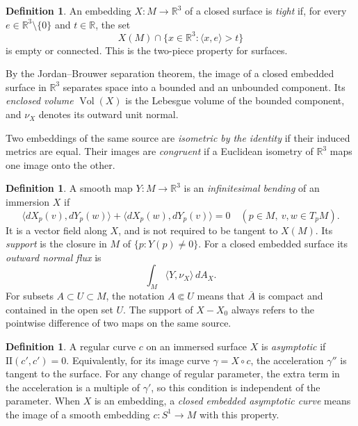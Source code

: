 \documentclass[11pt]{amsart}
\theoremstyle{definition}
\newtheorem{definition}[theorem]{Definition}
\newcommand{\R}{\mathbb R}
\DeclareMathOperator{\Vol}{Vol}
\begin{document}
\begin{definition}\label{def:tight}
An embedding $X:M\to\R^3$ of a closed surface is \emph{tight} if, for
every $e\in\R^3\setminus\{0\}$ and $t\in\R$, the set
\[
 X(M)\cap\{x\in\R^3:\langle x,e\rangle>t\}
\]
is empty or connected. This is the two-piece property for surfaces.

By the Jordan--Brouwer separation theorem, the image of a closed
embedded surface in $\R^3$ separates space into a bounded and an
unbounded component. Its \emph{enclosed volume}
$\Vol(X)$ is the Lebesgue volume of the bounded component, and
$\nu_X$ denotes its outward unit normal.

Two embeddings of the same source are \emph{isometric by the identity}
if their induced metrics are equal. Their images are \emph{congruent}
if a Euclidean isometry of $\R^3$ maps one image onto the other.
\end{definition}

\begin{definition}\label{def:bending}
A smooth map $Y:M\to\R^3$ is an \emph{infinitesimal bending} of an
immersion $X$ if
\begin{equation}\label{eq:strain}
 \langle dX_p(v),dY_p(w)\rangle+
 \langle dX_p(w),dY_p(v)\rangle=0
 \quad(p\in M,\ v,w\in T_pM).
\end{equation}
It is a vector field along $X$, and is not required to be tangent to
$X(M)$. Its \emph{support} is the closure in $M$ of
$\{p:Y(p)\ne0\}$. For a closed embedded surface its \emph{outward normal
flux} is
\[
 \int_M\langle Y,\nu_X\rangle\,dA_X.
\]
For subsets $A\subset U\subset M$, the notation $A\Subset U$ means that
$\overline A$ is compact and contained in the open set $U$.
The support of $X-X_0$ always refers to the pointwise difference of
two maps on the same source.
\end{definition}

\begin{definition}\label{def:asymptotic}
A regular curve $c$ on an immersed surface $X$ is \emph{asymptotic}
if $\mathrm{II}(c',c')=0$. Equivalently, for its image curve
$\gamma=X\circ c$, the acceleration $\gamma''$ is tangent to the
surface. For any change of regular parameter, the extra term in
the acceleration is a multiple of $\gamma'$, so this condition is
independent of the parameter. When $X$ is an embedding, a
\emph{closed embedded asymptotic curve} means the image of a smooth
embedding $c:S^1\to M$ with this property.
\end{definition}
\end{document}
